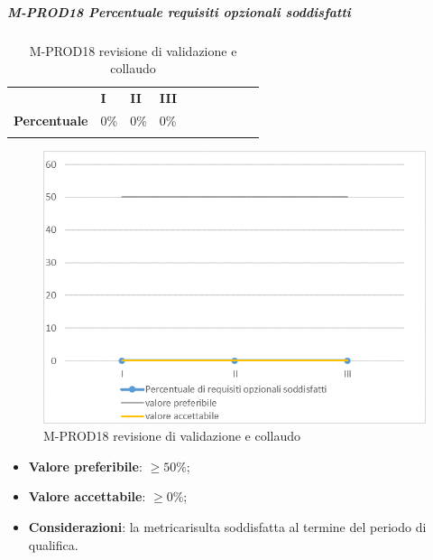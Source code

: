 \subparagraph{M-PROD18 Percentuale requisiti opzionali soddisfatti} \mbox{}
\begin{longtable}[H!] {						
		>{}p{50mm}  		
		>{}p{8mm}
		>{}p{8mm}		
		>{}p{8mm}		
		>{}p{8mm}		
		>{}p{8mm}		
		>{}p{8mm}
		>{}p{8mm}
		>{}p{8mm}
		>{}p{8mm}
	}
	\rowcolor{gray!50}
	\textbf{} & \textbf{I} & \textbf{II} & \textbf{III}  \TBstrut \\ [2mm]
	\textbf{Percentuale} & 0\% & 0\% & 0\%  \TBstrut \\ [2mm]
	\rowcolor{white}
	\caption{M-PROD18 revisione di validazione e collaudo}
\end{longtable}
\begin{figure}[H] 	
	\includegraphics[width=\linewidth]{./img/grafici/RA18.png}	
	\caption{M-PROD18 revisione di validazione e collaudo}	
\end{figure}
\begin{itemize}
	\item \textbf{Valore preferibile}: $\ge 50\%$;
	\item \textbf{Valore accettabile}: $\ge 0\%$;
	\item \textbf{Considerazioni}: la metrica\glosp risulta soddisfatta al termine del periodo di qualifica.
\end{itemize}

